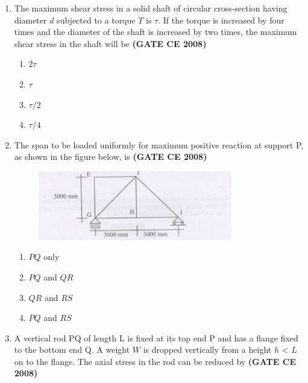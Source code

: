 \documentclass[journal]{IEEEtran}
\begin{document}
\begin{enumerate}
\item The maximum shear stress in a solid shaft of circular cross-section having diameter $d$ subjected to a torque $T$ is $\tau$. If the torque is increased by four times and the diameter of the shaft is increased by two times, the maximum shear stress in the shaft will be  \textbf{(GATE CE 2008)}
\begin{multicols}{2}
\begin{enumerate}
\item $2\tau$
\item $\tau$
\item $\tau /2$
\item $\tau /4$
\end{enumerate}
\end{multicols}

\item The span to be loaded uniformly for maximum positive  reaction at support P, as shown in the figure below, is \textbf{(GATE CE 2008)}
\begin{figure}[h]
    \centering
    \includegraphics[width=0.8\textwidth]{image7.png}
\end{figure}

\vspace{0.1cm}

\begin{multicols}{2}
\begin{enumerate}
\item $PQ$ only
\item $PQ$ and $QR$
\item $QR$ and $RS$
\item $PQ$ and $RS$
\end{enumerate}
\end{multicols}

\item A vertical rod PQ of length L is fixed at its top end P and has a flange fixed to the bottom end Q. A weight $W$ is dropped vertically from a height $h$ < $L$ on to the flange. The axial stress in the rod can be reduced by \textbf{(GATE CE 2008)}


\end{enumerate}
\end{document}

